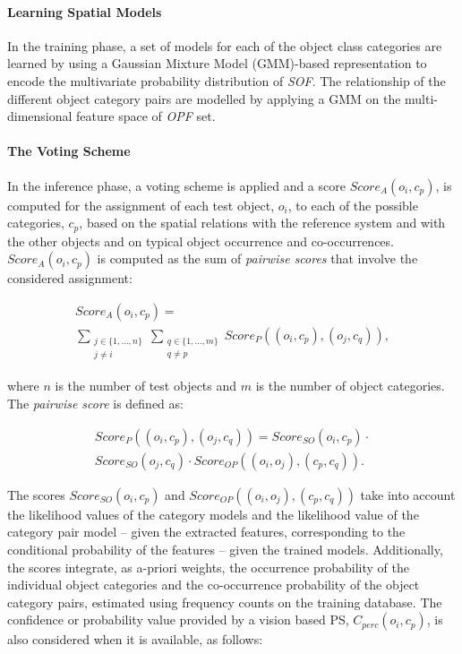 \documentclass[letterpaper]{article}
\begin{document}
\paragraph{Learning Spatial Models}

In the training phase, a set of models for each of the object class categories are learned by using a Gaussian Mixture Model (GMM)-based representation to encode the multivariate probability distribution of \emph{SOF}. The relationship of the different object category pairs are modelled by applying a GMM on the multi-dimensional feature space of \emph{OPF} set.

\paragraph{The Voting Scheme}

In the inference phase, a voting scheme is applied and a score $Score_{A}(o_{i}, c_{p})$, is computed for the assignment of each test object, $o_{i}$, to each of the possible categories, $c_{p}$, based on the spatial relations with the reference system and with the other objects and on typical object occurrence and co-occurrences. $Score_{A}(o_{i}, c_{p})$ is computed as the sum of \emph{pairwise scores} that involve the considered assignment:

\begin{multline}
Score_{A}(o_{i}, c_{p}) = \\ 
				\sum_{\substack{j \in \{1,\dots,n\} \\ j \neq i} } \sum_{\substack{q \in \{1,\dots,m\} \\ q \neq p}} 
                                 Score_{P}((o_{i}, c_{p}), (o_{j}, c_{q})), 
\label{eq:totalScore}
\end{multline}

\noindent where $n$ is the number of test objects and $m$ is the number of object categories. The \emph{pairwise score} is defined as:

\begin{multline}
Score_{P}((o_{i}, c_{p}), (o_{j}, c_{q})) = Score_{SO}(o_{i}, c_{p}) \cdot \\ Score_{SO}(o_{j}, c_{q}) \cdot Score_{OP}((o_{i}, o_{j}), (c_{p}, c_{q})).
\end{multline}

The scores $Score_{SO}(o_{i}, c_{p})$ and $Score_{OP}((o_{i}, o_{j}), (c_{p}, c_{q}))$ take into account the likelihood values of the category models and the likelihood value of the category pair model -- given the extracted features, corresponding to the conditional probability of the features -- given the trained models. Additionally, the scores integrate, as a-priori weights, the occurrence probability of the individual object categories and the co-occurrence probability of the object category pairs, estimated using frequency counts on the training database. The confidence or probability value provided by a vision based PS, $C_{perc}(o_{i}, c_{p})$, is also considered when it is available, as follows:
\end{document}
